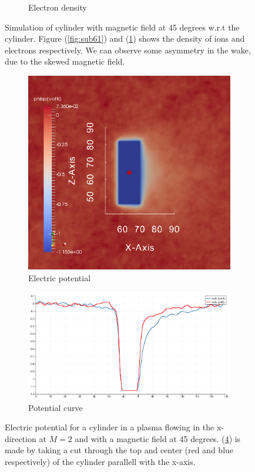\documentclass[twoside]{article}
\begin{document}
\begin{figure}[H]
\begin{subfigure}{.5\textwidth}
  \caption{Electron density}
  \label{fig:sub62}
\end{subfigure}
\caption{Simulation of cylinder with magnetic field at 45 degrees w.r.t the cylinder. Figure (\ref{fig:sub61}) and (\ref{fig:sub62}) shows the density of ions and electrons respectively. We can observe some asymmetry in the wake, due to the skewed magnetic field.}
\label{fig:6}
\end{figure}

\begin{figure}[H]
\centering
\begin{subfigure}{.5\textwidth}
  \includegraphics[width=0.85\linewidth]{zoom_png/phisp_zoom.png}
  \caption{Electric potential}
  \label{fig:sub71}
\end{subfigure}%
\begin{subfigure}{.5\textwidth}
  \hspace{-10mm}
  \includegraphics[width=1.2\linewidth]{cmp_phisp.png}
  \caption{Potential curve}
  \label{fig:sub72}
\end{subfigure}
\caption{Electric potential for a cylinder in a plasma flowing in the x-direction at $M=2$ and with a magnetic field at 45 degrees. (\ref{fig:sub72}) is made by taking a cut through the top and center (red and blue respectively) of the cylinder parallell with the x-axis.}
\label{fig:7}
\end{figure}
\end{document}
